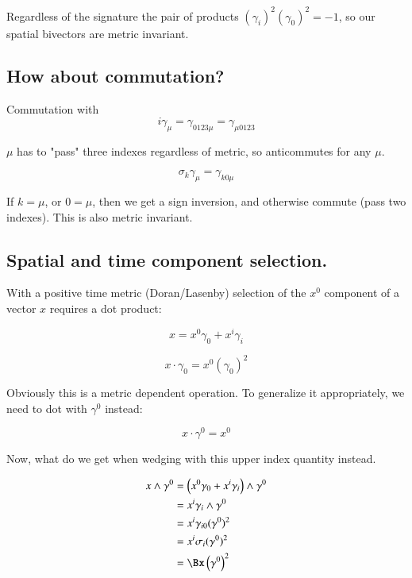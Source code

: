 Regardless of the signature the pair of products $(\gamma_i)^2 (\gamma_{0})^2 = -1$, so our spatial bivectors are metric invariant.

\subsection{How about commutation? }

Commutation with
\begin{equation*}
i \gamma_{\mu} = \gamma_{0123\mu} = \gamma_{\mu0123}
\end{equation*}

$\mu$ has to "pass" three indexes regardless of metric, so anticommutes for any $\mu$.

\begin{equation*}
\sigma_k \gamma_{\mu} = \gamma_{k0\mu}
\end{equation*}

If $k = \mu$, or $0 = \mu$, then we get a sign inversion, and otherwise commute (pass two indexes).  This is also metric invariant.

\subsection{Spatial and time component selection. }

With a positive time metric (Doran/Lasenby) selection of the $x^0$ component of a vector $x$ requires a dot product:

\begin{equation*}
x = x^0 \gamma_0 + x^i \gamma_i
\end{equation*}

\begin{equation*}
x \cdot \gamma_0 = x^0 (\gamma_0)^2
\end{equation*}

Obviously this is a metric dependent operation.  To generalize it appropriately, we need to dot with $\gamma^0$ instead:

\begin{equation*}
x \cdot \gamma^0 = x^0
\end{equation*}

Now, what do we get when wedging with this upper index quantity instead.

\begin{align*}
x \wedge \gamma^0
&= \left(x^0 \gamma_0 + x^i \gamma_i\right) \wedge \gamma^0 \\
&= x^i \gamma_i \wedge \gamma^0 \\
&= x^i \gamma_{i0} (\gamma^0)^2 \\
&= x^i \sigma_i (\gamma^0)^2 \\
&= \Bx \left(\gamma^0\right)^2
\end{align*}

